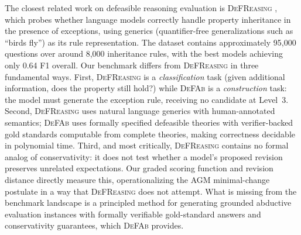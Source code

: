 \documentclass{article}
\theoremstyle{definition}
\begin{document}
The closest related work on defeasible reasoning evaluation is \textsc{DeFReasing} \cite{allaway2025defreasing}, which probes whether language models correctly handle property inheritance in the presence of exceptions, using generics (quantifier-free generalizations such as ``birds fly'') as its rule representation. The dataset contains approximately 95,000 questions over around 8,000 inheritance rules, with the best models achieving only 0.64 F1 overall. Our benchmark differs from \textsc{DeFReasing} in three fundamental ways. First, \textsc{DeFReasing} is a \emph{classification} task (given additional information, does the property still hold?) while \textsc{DeFAb} is a \emph{construction} task: the model must generate the exception rule, receiving no candidate at Level~3. Second, \textsc{DeFReasing} uses natural language generics with human-annotated semantics; \textsc{DeFAb} uses formally specified defeasible theories with verifier-backed gold standards computable from complete theories, making correctness decidable in polynomial time. Third, and most critically, \textsc{DeFReasing} contains no formal analog of conservativity: it does not test whether a model's proposed revision preserves unrelated expectations. Our graded scoring function and revision distance directly measure this, operationalizing the AGM minimal-change postulate in a way that \textsc{DeFReasing} does not attempt. What is missing from the benchmark landscape is a principled method for generating grounded abductive evaluation instances with formally verifiable gold-standard answers and conservativity guarantees, which \textsc{DeFAb} provides.
\end{document}
